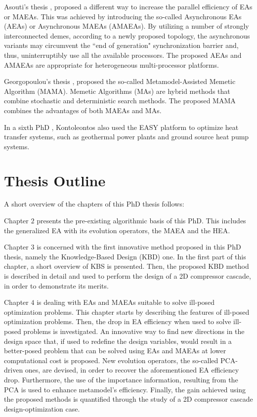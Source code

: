 Asouti's thesis \cite{phd_Vera}, proposed a different way to increase the parallel efficiency of EAs or MAEAs. This was achieved by introducing the so-called Asynchronous EAs (AEAs) or Asynchronous MAEAs (AMAEAs). By utilizing a number of strongly interconnected demes, according to a newly proposed topology, the asynchronous variants may circumvent the ``end of generation" synchronization barrier and, thus, uninterruptibly use all the available processors.     The proposed AEAs and AMAEAs are appropriate for heterogeneous multi-processor platforms. 


Georgopoulou's thesis \cite{phd_Chara}, proposed the so-called Metamodel-Assisted Memetic Algorithm (MAMA). Memetic Algorithms (MAs) are hybrid
methods that combine stochastic and deterministic search methods. The proposed MAMA combines the advantages of both MAEAs and MAs.
 
In a sixth PhD \cite{phd_eugene}, Kontoleontos also used the EASY platform to optimize heat transfer systems, such as
geothermal power plants and ground source heat pump systems.
 
 
\section{Thesis Outline} %
A short overview of the chapters of this PhD thesis follows:

Chapter $2$ presents the pre-existing algorithmic basis of this PhD. This includes the generalized EA with its evolution operators, the MAEA and the HEA.

Chapter $3$ is concerned with the first innovative method proposed in this PhD thesis, namely the Knowledge-Based Design (KBD) one. In the first part of this chapter, a short overview of KBS is presented. Then, the proposed KBD method is described in detail and used to perform the design of a 2D compressor cascade, in order to demonstrate its merits.

Chapter $4$ is dealing with EAs and MAEAs suitable to solve ill-posed optimization problems. This chapter starts by describing the features of ill-posed optimization problems. Then, the drop in EA efficiency when used to solve ill-posed problems is investigated. An innovative way to find new directions in the design space that, if used to redefine the design variables, would result in a better-posed problem that can be solved using EAs and MAEAs at lower computational cost is proposed.  New evolution operators, the so-called PCA-driven ones, are devised, in order to recover the aforementioned EA efficiency drop. Furthermore, the use of the importance information, resulting from the PCA is used to enhance metamodel's efficiency. Finally, the gain achieved using the proposed methods is quantified through the study of a 2D compressor cascade design-optimization case.

